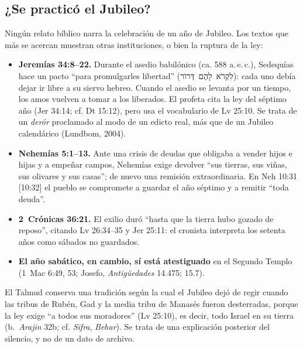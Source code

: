 \documentclass[11pt,letterpaper]{article}
\newcommand{\heb}[1]{\mbox{\foreignlanguage{hebrew}{#1}}}
\begin{document}
\subsection{¿Se practicó el Jubileo?}
Ningún relato bíblico narra la celebración de un año de Jubileo. Los textos que más se acercan muestran otras instituciones, o bien la ruptura de la ley:
\begin{itemize}\setlength{\itemsep}{1pt}
\item \textbf{Jeremías 34:8--22.} Durante el asedio babilónico (ca. 588 a.\,e.\,c.), Sedequías hace un pacto ``para promulgarles libertad'' (\heb{לִקְרֹא לָהֶם דְּרוֹר}): cada uno debía dejar ir libre a su siervo hebreo. Cuando el asedio se levanta por un tiempo, los amos vuelven a tomar a los liberados. El profeta cita la ley del séptimo año (Jer 34:14; cf. Dt 15:12), pero usa el vocabulario de Lv 25:10. Se trata de un \emph{derór} proclamado al modo de un edicto real, más que de un Jubileo calendárico (Lundbom, 2004).
\item \textbf{Nehemías 5:1--13.} Ante una crisis de deudas que obligaba a vender hijos e hijas y a empeñar campos, Nehemías exige devolver ``sus tierras, sus viñas, sus olivares y sus casas''; de nuevo una remisión extraordinaria. En Neh 10:31 [10:32] el pueblo se compromete a guardar el año séptimo y a remitir ``toda deuda''.
\item \textbf{2~Crónicas 36:21.} El exilio duró ``hasta que la tierra hubo gozado de reposo'', citando Lv 26:34--35 y Jer 25:11: el cronista interpreta los setenta años como sábados no guardados.
\item \textbf{El año sabático, en cambio, sí está atestiguado} en el Segundo Templo (1~Mac 6:49, 53; Josefo, \emph{Antigüedades} 14.475; 15.7).
\end{itemize}

El Talmud conserva una tradición según la cual el Jubileo dejó de regir cuando las tribus de Rubén, Gad y la media tribu de Manasés fueron desterradas, porque la ley exige ``a todos sus moradores'' (Lv 25:10), es decir, todo Israel en su tierra (b.~\emph{Arajin} 32b; cf. \emph{Sifra}, \emph{Behar}). Se trata de una explicación posterior del silencio, y no de un dato de archivo.
\end{document}
